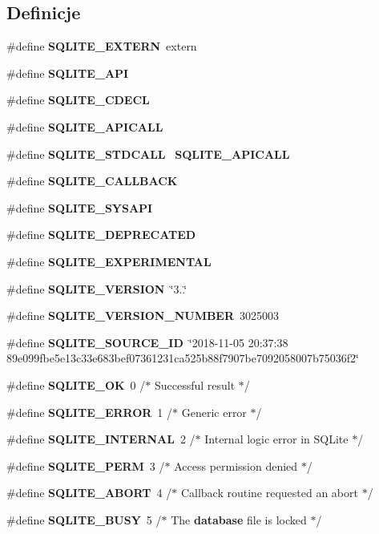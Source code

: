 \subsection*{Definicje}
\begin{DoxyCompactItemize}
\item 
\#define \textbf{ S\+Q\+L\+I\+T\+E\+\_\+\+E\+X\+T\+E\+RN}~extern
\item 
\#define \textbf{ S\+Q\+L\+I\+T\+E\+\_\+\+A\+PI}
\item 
\#define \textbf{ S\+Q\+L\+I\+T\+E\+\_\+\+C\+D\+E\+CL}
\item 
\#define \textbf{ S\+Q\+L\+I\+T\+E\+\_\+\+A\+P\+I\+C\+A\+LL}
\item 
\#define \textbf{ S\+Q\+L\+I\+T\+E\+\_\+\+S\+T\+D\+C\+A\+LL}~\textbf{ S\+Q\+L\+I\+T\+E\+\_\+\+A\+P\+I\+C\+A\+LL}
\item 
\#define \textbf{ S\+Q\+L\+I\+T\+E\+\_\+\+C\+A\+L\+L\+B\+A\+CK}
\item 
\#define \textbf{ S\+Q\+L\+I\+T\+E\+\_\+\+S\+Y\+S\+A\+PI}
\item 
\#define \textbf{ S\+Q\+L\+I\+T\+E\+\_\+\+D\+E\+P\+R\+E\+C\+A\+T\+ED}
\item 
\#define \textbf{ S\+Q\+L\+I\+T\+E\+\_\+\+E\+X\+P\+E\+R\+I\+M\+E\+N\+T\+AL}
\item 
\#define \textbf{ S\+Q\+L\+I\+T\+E\+\_\+\+V\+E\+R\+S\+I\+ON}~\char`\"{}3..\char`\"{}
\item 
\#define \textbf{ S\+Q\+L\+I\+T\+E\+\_\+\+V\+E\+R\+S\+I\+O\+N\+\_\+\+N\+U\+M\+B\+ER}~3025003
\item 
\#define \textbf{ S\+Q\+L\+I\+T\+E\+\_\+\+S\+O\+U\+R\+C\+E\+\_\+\+ID}~\char`\"{}2018-\/11-\/05 20\+:37\+:38 89e099fbe5e13c33e683bef07361231ca525b88f7907be7092058007b75036f2\char`\"{}
\item 
\#define \textbf{ S\+Q\+L\+I\+T\+E\+\_\+\+OK}~0   /$\ast$ Successful result $\ast$/
\item 
\#define \textbf{ S\+Q\+L\+I\+T\+E\+\_\+\+E\+R\+R\+OR}~1   /$\ast$ Generic error $\ast$/
\item 
\#define \textbf{ S\+Q\+L\+I\+T\+E\+\_\+\+I\+N\+T\+E\+R\+N\+AL}~2   /$\ast$ Internal logic error in S\+Q\+Lite $\ast$/
\item 
\#define \textbf{ S\+Q\+L\+I\+T\+E\+\_\+\+P\+E\+RM}~3   /$\ast$ Access permission denied $\ast$/
\item 
\#define \textbf{ S\+Q\+L\+I\+T\+E\+\_\+\+A\+B\+O\+RT}~4   /$\ast$ Callback routine requested an abort $\ast$/
\item 
\#define \textbf{ S\+Q\+L\+I\+T\+E\+\_\+\+B\+U\+SY}~5   /$\ast$ The \textbf{ database} file is locked $\ast$/

\end{DoxyCompactItemize}
